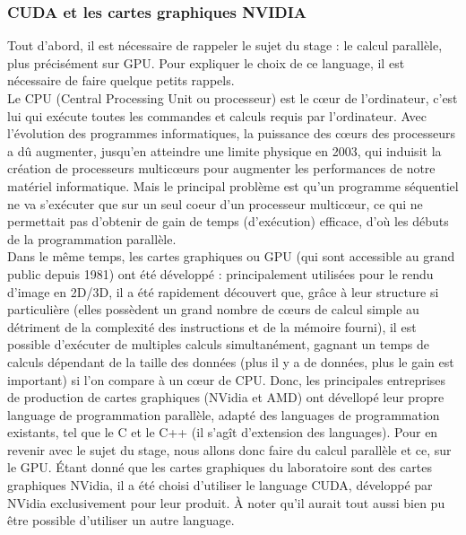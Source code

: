 \documentclass[a4paper,12pt]{article}
\begin{document}
{	\subsubsection{CUDA et les cartes graphiques NVIDIA}
	\indent Tout d'abord, il est n\'e{}cessaire de rappeler le sujet du stage : le calcul parall\`ele, plus pr\'e{}cis\'e{}ment sur GPU. Pour expliquer le choix de ce language, il est n\'e{}cessaire de faire quelque petits rappels. \\
	\indent Le CPU (Central Processing Unit ou processeur) est le c\oe{}ur de l'ordinateur, c'est lui qui ex\'e{}cute toutes les commandes et calculs requis par l'ordinateur. Avec l'\'e{}volution des programmes informatiques, la puissance des c\oe{}urs des processeurs a d\^u augmenter, jusqu'en atteindre une limite physique en 2003, qui induisit la cr\'e{}ation de processeurs multic\oe{}urs pour augmenter les performances de notre mat\'e{}riel informatique. Mais le principal probl\`eme est qu'un programme s\'e{}quentiel ne va s'ex\'e{}cuter que sur un seul coeur d'un processeur multic\oe{}ur, ce qui ne permettait pas d'obtenir de gain de temps (d'ex\'e{}cution) efficace, d'o\`u les d\'e{}buts de la programmation parall\`ele. \\
	\indent Dans le m\^eme temps, les cartes graphiques ou GPU (qui sont accessible au grand public depuis 1981) ont \'e{}t\'e{} d\'e{}velopp\'e{} : principalement utilis\'e{}es pour le rendu d'image en 2D/3D, il a \'e{}t\'e{} rapidement d\'e{}couvert que, gr\^ace \`a leur structure si particuli\`ere (elles poss\`edent un grand nombre de c\oe{}urs de calcul simple au d\'e{}triment de la complexit\'e{} des instructions et de la m\'e{}moire fourni), il est possible d'ex\'e{}cuter de multiples calculs simultan\'e{}ment, gagnant un temps de calculs d\'e{}pendant de la taille des donn\'e{}es (plus il y a de donn\'e{}es, plus le gain est important) si l'on compare à un c\oe{}ur de CPU. Donc, les principales entreprises de production de cartes graphiques (NVidia et AMD) ont d\'e{}vellop\'e{} leur propre language de programmation parall\`ele, adapt\'e{} des languages de programmation existants, tel que le C et le C++ (il s'ag\^it d'extension des languages).
	\medbreak
	\indent Pour en revenir avec le sujet du stage, nous allons donc faire du calcul parall\`ele et ce, sur le GPU. \'E{}tant donn\'e que les cartes graphiques du laboratoire sont des cartes graphiques NVidia, il a \'e{}t\'e choisi d'utiliser le language CUDA, d\'e{}velopp\'e par NVidia exclusivement pour leur produit. \`A noter qu'il aurait tout aussi bien pu \^etre possible d'utiliser un autre language.
}
\end{document}

